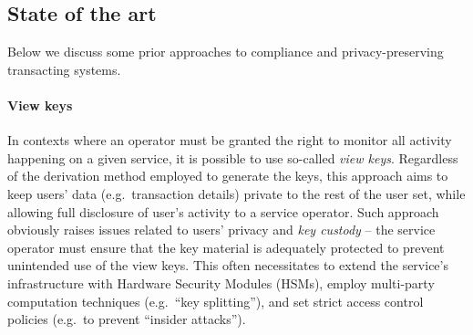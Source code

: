 \documentclass[runningheads,10pt]{llncs}
\numberwithin{equation}{section}
\begin{document}

\subsection{State of the art}


Below we discuss some prior approaches to compliance and privacy-preserving
transacting systems.

\paragraph{View keys}\label{val-candidates:ssec:data-reveal}
In contexts where an operator must be granted the right to monitor all activity
happening on a given service, it is possible to use so-called \emph{view keys}.
Regardless of the derivation method employed to generate the keys, this approach
aims to keep users' data (e.g.~transaction details) private to the rest of the
user set, while allowing full disclosure of user's activity to a service
operator. Such approach obviously raises issues related to users' privacy and
\emph{key custody} -- the service operator must ensure that the key material is
adequately protected to prevent unintended use of the view keys. This often
necessitates to extend the service's infrastructure with Hardware Security
Modules (HSMs), employ multi-party computation techniques (e.g.~``key
splitting''), and set strict access control policies (e.g.~to prevent ``insider
attacks'').
\end{document}
